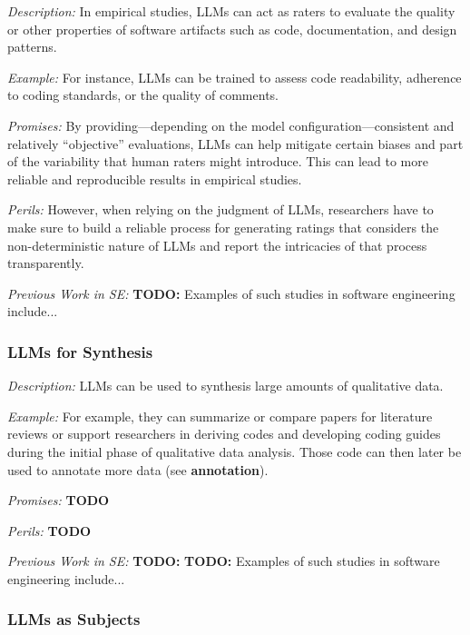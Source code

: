 \documentclass[11pt]{article}
\begin{document}
\emph{Description:} In empirical studies, LLMs can act as raters to evaluate the quality or other properties of software artifacts such as code, documentation, and design patterns.

\emph{Example:}  For instance, LLMs can be trained to assess code readability, adherence to coding standards, or the quality of comments. 

\emph{Promises:} By providing---depending on the model configuration---consistent and relatively ``objective'' evaluations, LLMs can help mitigate certain biases and part of the variability that human raters might introduce. 
This can lead to more reliable and reproducible results in empirical studies.

\emph{Perils:} However, when relying on the judgment of LLMs, researchers have to make sure to build a reliable process for generating ratings that considers the non-deterministic nature of LLMs and report the intricacies of that process transparently.

\emph{Previous Work in SE:}  \textbf{TODO:} Examples of such studies in software engineering include...


\subsubsection{LLMs for Synthesis}

\emph{Description:} LLMs can be used to synthesis large amounts of qualitative data.

\emph{Example:}  For example, they can summarize or compare papers for literature reviews or support researchers in deriving codes and developing coding guides during the initial phase of qualitative data analysis. Those code can then later be used to annotate more data (see \textbf{annotation}).

\emph{Promises:} \textbf{TODO}

\emph{Perils:} \textbf{TODO}

\emph{Previous Work in SE:}  \textbf{TODO:}  \textbf{TODO:} Examples of such studies in software engineering include...


\subsubsection{LLMs as Subjects}
\end{document}
